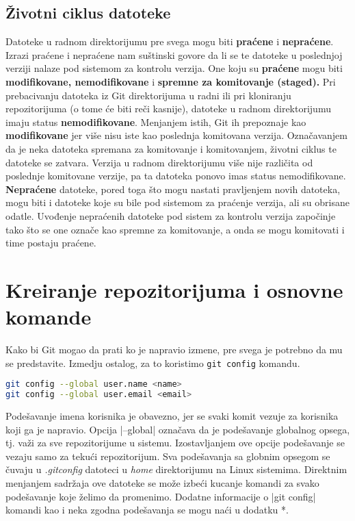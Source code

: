 \documentclass[a4paper]{article}
\begin{document}
{\subsection{Životni ciklus datoteke}
\label{subsec:ciklus}
Datoteke u radnom direktorijumu pre svega mogu biti \textbf{praćene} i \textbf{nepraćene}. Izrazi praćene i nepraćene nam suštinski govore da li se te datoteke u poslednjoj verziji nalaze pod sistemom za kontrolu verzija.
\linebreak \indent
One koju su \textbf{praćene} mogu biti \textbf{modifikovane, nemodifikovane} i \textbf{spremne za komitovanje (staged).} Pri prebacivanju datoteka iz Git direktorijuma u radni ili pri kloniranju repozitorijuma (o tome će biti reči kasnije), datoteke u radnom direktorijumu imaju status \textbf{nemodifikovane}. Menjanjem istih, Git ih prepoznaje kao \textbf{modifikovane} jer više nisu iste kao poslednja komitovana verzija. Označavanjem da je neka datoteka spremana za komitovanje i komitovanjem, životni ciklus te datoteke se zatvara. Verzija u radnom direktorijumu više nije različita od poslednje komitovane verzije, pa ta datoteka ponovo imas status nemodifikovane.
\linebreak \indent
\textbf{Nepraćene} datoteke, pored toga što mogu nastati pravljenjem novih datoteka, mogu biti i datoteke koje su bile pod sistemom za praćenje verzija, ali su obrisane odatle. Uvođenje nepraćenih datoteke pod sistem za kontrolu verzija započinje tako što se one označe kao spremne za komitovanje, a onda se mogu komitovati i time postaju praćene.



\section{Kreiranje repozitorijuma i osnovne komande}
\label{sec:kreiranje}

Kako bi Git mogao da prati ko je napravio izmene, pre svega je potrebno da mu se predstavite. Izmedju ostalog, za to koristimo  \texttt{git config} komandu.

\begin{lstlisting}[language=bash]
git config --global user.name <name>
git config --global user.email <email>
\end{lstlisting}

\noindent
Podešavanje imena korisnika je obavezno, jer se svaki komit vezuje za korisnika koji ga je napravio. Opcija |--global| označava da je podešavanje globalnog opsega, tj. važi za sve repozitorijume u sistemu. Izostavljanjem ove opcije podešavanje se vezaju samo za tekući repozitorijum. Sva podešavanja sa globnim opsegom se čuvaju u \textit{.gitconfig} datoteci u \textit{home} direktorijumu na Linux sistemima. Direktnim menjanjem sadržaja ove datoteke se može izbeći kucanje komandi za svako podešavanje koje želimo da promenimo. Dodatne informacije o |git config| komandi kao i neka zgodna podešavanja se mogu naći u dodatku *.

}
\end{document}
